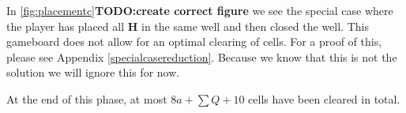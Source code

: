 In \autoref{fig:placementc}\textbf{TODO:create correct figure} we see the special case where the player has placed all $\mathbf{H}$ in the same well and then closed the well. This gameboard does not allow for an optimal clearing of cells. For a proof of this, please see Appendix \ref{specialcasereduction}. Because we know that this is not the solution we will ignore this for now.

At the end of this phase, at most $8a + \sum Q + 10$ cells have been cleared in total.
